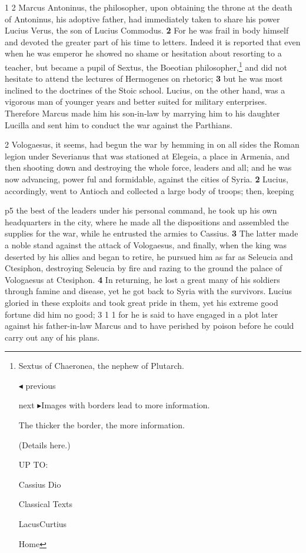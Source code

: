 1 2
Marcus Antoninus, the philosopher, upon obtaining the throne at the death of Antoninus, his adoptive father, had immediately taken to share his power Lucius Verus, the son of Lucius Commodus. \textbf{2} For he was frail in body himself and devoted the greater part of his time to letters. Indeed it is reported that even when he was emperor he showed no shame or hesitation about resorting to a teacher, but became a pupil of Sextus, the Boeotian philosopher,\texthebrew{⁠}\footnote{Sextus of Chaeronea, the nephew of Plutarch.

\texthebrew{◂} previous

next \texthebrew{▸}Images with borders lead to more information.

The thicker the border, the more information.

(Details here.)

UP TO:

Cassius Dio

Classical Texts

LacusCurtius

Home} and did not hesitate to attend the lectures of Hermogenes on rhetoric; \textbf{3} but he was most inclined to the doctrines of the Stoic school. Lucius, on the other hand, was a vigorous man of younger years and better suited for military enterprises. Therefore Marcus made him his son-in\texthebrew{‑}law by marrying him to his daughter Lucilla and sent him to conduct the war against the Parthians.

2 Vologaesus, it seems, had begun the war by hemming in on all sides the Roman legion under Severianus that was stationed at Elegeia, a place in Armenia, and then shooting down and destroying the whole force, leaders and all; and he was now advancing, power ­ful and formidable, against the cities of Syria. \textbf{2} Lucius, accordingly, went to Antioch and collected a large body of troops; then, keeping

p5 the best of the leaders under his personal command, he took up his own headquarters in the city, where he made all the dispositions and assembled the supplies for the war, while he entrusted the armies to Cassius. \textbf{3} The latter made a noble stand against the attack of Vologaesus, and finally, when the king was deserted by his allies and began to retire, he pursued him as far as Seleucia and Ctesiphon, destroying Seleucia by fire and razing to the ground the palace of Vologaesus at Ctesiphon. \textbf{4} In returning, he lost a great many of his soldiers through famine and disease, yet he got back to Syria with the survivors. Lucius gloried in these exploits and took great pride in them, yet his extreme good fortune did him no good; 3 1 1 for he is said to have engaged in a plot later against his father-in\texthebrew{‑}law Marcus and to have perished by poison before he could carry out any of his plans.

